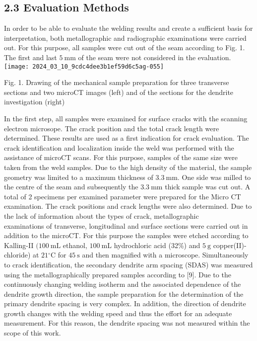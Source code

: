 \documentclass[10pt]{article}
\begin{document}
\subsection*{2.3 Evaluation Methods}
In order to be able to evaluate the welding results and create a sufficient basis for interpretation, both metallographic and radiographic examinations were carried out. For this purpose, all samples were cut out of the seam according to Fig. 1. The first and last $5 \mathrm{~mm}$ of the seam were not considered in the evaluation.\\
\texttt{[image: 2024\_03\_10\_9cdc4dee3b1ef59d6c5ag-055]}

Fig. 1. Drawing of the mechanical sample preparation for three transverse sections and two microCT images (left) and of the sections for the dendrite investigation (right)

In the first step, all samples were examined for surface cracks with the scanning electron microsope. The crack position and the total crack length were determined. These results are used as a first indication for crack evaluation. The crack identification and localization inside the weld was performed with the assistance of microCT scans. For this purpose, samples of the same size were taken from the weld samples. Due to the high density of the material, the sample geometry was limited to a maximum thickness of $3.3 \mathrm{~mm}$. One side was milled to the centre of the seam and subsequently the $3.3 \mathrm{~mm}$ thick sample was cut out. A total of 2 specimens per examined parameter were prepared for the Micro CT examination. The crack positions and crack lengths were also determined. Due to the lack of information about the types of crack, metallographic\\
examinations of transverse, longitudinal and surface sections were carried out in addition to the microCT. For this purpose the samples were etched according to Kalling-II $(100 \mathrm{~mL}$ ethanol, $100 \mathrm{~mL}$ hydrochloric acid (32\%) and $5 \mathrm{~g}$ copper(II)-chloride) at $21{ }^{\circ} \mathrm{C}$ for $45 \mathrm{~s}$ and then magnified with a microscope. Simultaneously to crack identification, the secondary dendrite arm spacing (SDAS) was measured using the metallographically prepared samples according to [9]. Due to the continuously changing welding isotherm and the associated dependence of the dendrite growth direction, the sample preparation for the determination of the primary dendrite spacing is very complex. In addition, the direction of dendrite growth changes with the welding speed and thus the effort for an adequate measurement. For this reason, the dendrite spacing was not measured within the scope of this work.
\end{document}
